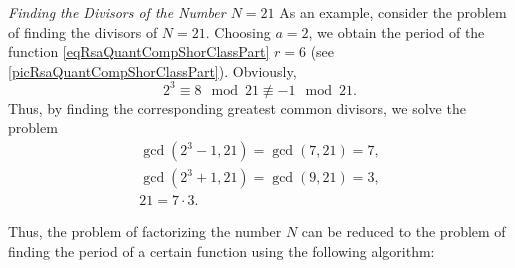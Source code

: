 \begin{example}
\emph{Finding the Divisors of the Number $N=21$}
\label{exRsaQuantCompShorGCD}
As an example, consider the problem of finding the divisors of $N =
21$. Choosing $a=2$, we obtain the period of the function
\eqref{eqRsaQuantCompShorClassPart} $r = 6$ (see
\autoref{picRsaQuantCompShorClassPart}). 
Obviously,
\[
2^3 \equiv 8 \mod{21} \not\equiv -1 \mod{21}.
\]
Thus, by finding the corresponding greatest common divisors, we solve
the problem
\begin{eqnarray}
\gcd\left( 2^3 - 1, 21 \right) = \gcd\left( 7, 21 \right)
= 7,
\nonumber \\
\gcd\left( 2^3 + 1, 21 \right) = \gcd\left( 9, 21 \right)
= 3,
\nonumber \\
21 = 7 \cdot 3.
\nonumber
\end{eqnarray}
\end{example}

Thus, the problem of factorizing the number $N$ can be reduced to
the problem of finding the period of a certain function using the following
algorithm:

